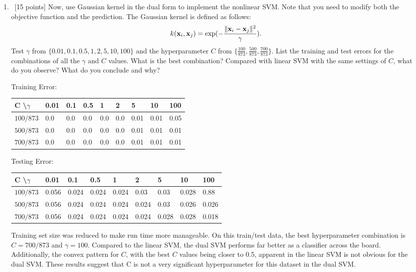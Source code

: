 \documentclass[12pt, fullpage,letterpaper]{article}
\begin{document}
\begin{enumerate}
\begin{enumerate}
	\bigbreak
	
	\item~[15 points] Now, use Gaussian kernel in the dual form to implement the nonlinear SVM. Note that you need to modify both the objective function and the prediction. The Gaussian kernel is defined as follows:
	\[
	k({\bf x}_i, {\bf x}_j) = \exp(-\frac{\|{\bf x}_i - {\bf x}_j\|^2}{\gamma}).
	\]
	Test $\gamma$ from $\{0.01, 0.1, 0.5, 1, 2, 5, 10, 100\}$ and the hyperparameter $C$ from $\{ \frac{100}{873}, \frac{500}{873},  \frac{700}{873}\}$. List the training and test errors for the combinations of all the $\gamma$ and $C$ values. What is the best combination? Compared with linear SVM with the same settings of $C$, what do you observe? What do you conclude and why?  
	
	Training Error:
	\begin{table}[h]
		\begin{tabular}{l||llllllll}
			C \textbackslash $\gamma$ & 0.01 & 0.1 & 0.5 & 1 & 2 & 5 & 10 & 100 \\
			\hline\hline
			$100/873$ & 0.0 & 0.0 & 0.0 & 0.0 & 0.0 & 0.01 & 0.01 & 0.05 \\
			$500/873$ & 0.0 & 0.0 & 0.0 & 0.0 & 0.0 & 0.01 & 0.01 & 0.01 \\
			$700/873$ & 0.0 & 0.0 & 0.0 & 0.0 & 0.0 & 0.01 & 0.01 & 0.01 \\
		\end{tabular}
	\end{table}

	Testing Error:
	\begin{table}[h]
		\begin{tabular}{l||llllllll}
			C \textbackslash $\gamma$ & 0.01 & 0.1 & 0.5 & 1 & 2 & 5 & 10 & 100 \\
			\hline\hline
			$100/873$ & 0.056 & 0.024 & 0.024 & 0.024 & 0.03 & 0.03 & 0.028 & 0.88 \\
			$500/873$ & 0.056 & 0.024 & 0.024 & 0.024 & 0.024 & 0.03 & 0.026 & 0.026 \\
			$700/873$ & 0.056 & 0.024 & 0.024 & 0.024 & 0.024 & 0.028 & 0.028 & 0.018 \\
		\end{tabular}
	\end{table}

	Training set size was reduced to make run time more manageable. On this train/test data, the best hyperparameter combination is $C = 700/873$ and $\gamma = 100$. Compared to the linear SVM, the dual SVM performs far better as a classifier across the board. Additionally, the convex pattern for $C$, with the best $C$ values being closer to 0.5, apparent in the linear SVM is not obvious for the dual SVM. These results suggest that C is not a very significant hyperparameter for this dataset in the dual SVM.
	

\end{enumerate}
\end{enumerate}
\end{document}
